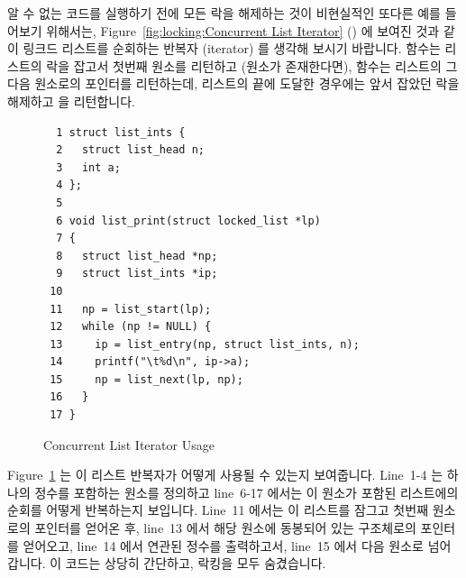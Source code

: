 알 수 없는 코드를 실행하기 전에 모든 락을 해제하는 것이 비현실적인 또다른 예를
들어보기 위해서는,
Figure~\ref{fig:locking:Concurrent List Iterator} () 에
보여진 것과 같이 링크드 리스트를 순회하는 반복자 (iterator) 를 생각해 보시기
바랍니다.
 함수는 리스트의 락을 잡고서 첫번째 원소를 리턴하고 (원소가
존재한다면),  함수는 리스트의 그 다음 원소로의 포인터를
리턴하는데, 리스트의 끝에 도달한 경우에는 앞서 잡았던 락을 해제하고 
을 리턴합니다.

\begin{figure}[tbp]
{ \scriptsize
\begin{verbatim}
  1 struct list_ints {
  2   struct list_head n;
  3   int a;
  4 };
  5 
  6 void list_print(struct locked_list *lp)
  7 {
  8   struct list_head *np;
  9   struct list_ints *ip;
 10 
 11   np = list_start(lp);
 12   while (np != NULL) {
 13     ip = list_entry(np, struct list_ints, n);
 14     printf("\t%d\n", ip->a);
 15     np = list_next(lp, np);
 16   }
 17 }
\end{verbatim}
}
\caption{Concurrent List Iterator Usage}
\label{fig:locking:Concurrent List Iterator Usage}
\end{figure}

Figure~\ref{fig:locking:Concurrent List Iterator Usage} 는 이 리스트 반복자가
어떻게 사용될 수 있는지 보여줍니다.
Line~1-4 는 하나의 정수를 포함하는  원소를 정의하고 line~6-17
에서는 이 원소가 포함된 리스트에의 순회를 어떻게 반복하는지 보입니다.
Line~11 에서는 이 리스트를 잠그고 첫번째 원소로의 포인터를 얻어온 후, line~13
에서 해당 원소에 동봉되어 있는  구조체로의 포인터를 얻어오고,
line~14 에서 연관된 정수를 출력하고서, line~15 에서 다음 원소로 넘어갑니다.
이 코드는 상당히 간단하고, 락킹을 모두 숨겼습니다.
\iffalse

